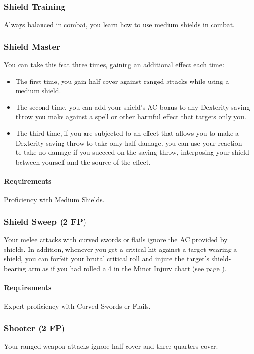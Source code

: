 \subsubsection{Shield Training} \label{feat::shieldtraining}
    Always balanced in combat, you learn how to use medium shields in combat.
\subsubsection{Shield Master} \label{feat::shieldmaster}
    You can take this feat three times, gaining an additional effect each time:
    \begin{itemize}
        \item The first time, you gain half cover against ranged attacks while using a medium shield.
        \item The second time, you can add your shield's AC bonus to any Dexterity saving throw you make against a spell or other harmful effect that targets only you.
        \item The third time, if you are subjected to an effect that allows you to make a Dexterity saving throw to take only half damage, you can use your reaction to take no damage if you succeed on the saving throw, interposing your shield between yourself and the source of the effect.
    \end{itemize}
    \paragraph{Requirements} Proficiency with Medium Shields.
\subsubsection{Shield Sweep (2 FP)} \label{feat::shieldsweep}
    Your melee attacks with curved swords or flails ignore the AC provided by shields.
    In addition, whenever you get a critical hit against a target wearing a shield, you can forfeit your brutal critical roll and injure the target's shield-bearing arm as if you had rolled a 4 in the Minor Injury chart (see page \pageref{ssec::injuriesandinsanity}).
    \paragraph{Requirements} Expert proficiency with Curved Swords or Flails.
\subsubsection{Shooter (2 FP)} \label{feat::shooter}
    Your ranged weapon attacks ignore half cover and three-quarters cover.


